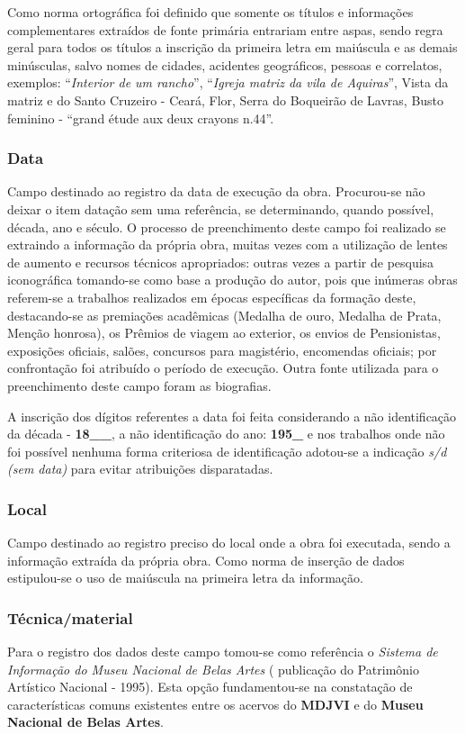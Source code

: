 Como norma ortográfica foi definido que somente os títulos e informações complementares extraídos de fonte primária entrariam entre aspas, sendo regra geral para todos os títulos a inscrição da primeira letra em maiúscula e as demais minúsculas, salvo nomes de cidades, acidentes geográficos, pessoas e correlatos, exemplos: ``\textit{Interior de um rancho}'', ``\textit{Igreja matriz da vila de Aquiras}'', Vista da matriz e do Santo Cruzeiro - Ceará, Flor, Serra do Boqueirão de Lavras, Busto feminino - ``grand étude aux deux crayons n.44''.

\subsubsection{Data}
Campo destinado ao registro da data de execução da obra. Procurou-se não deixar o item datação sem uma referência, se determinando, quando possível, década, ano e século. O processo de preenchimento deste campo foi realizado se extraindo a informação da própria obra, muitas vezes com a utilização de lentes de aumento e recursos técnicos apropriados: outras vezes a partir de pesquisa iconográfica tomando-se como base a produção do autor, pois que inúmeras obras referem-se a trabalhos realizados em épocas específicas da formação deste, destacando-se as premiações acadêmicas (Medalha de ouro, Medalha de Prata, Menção honrosa), os Prêmios de viagem ao exterior, os envios de Pensionistas, exposições oficiais, salões, concursos para magistério, encomendas oficiais; por confrontação foi atribuído o período de execução. Outra fonte utilizada para o preenchimento deste campo foram as biografias.

A inscrição dos dígitos referentes a data foi feita considerando a não identificação da década - \textbf{18\_\_}, a não identificação do ano: \textbf{195\_} e nos trabalhos onde não foi possível nenhuma forma criteriosa de identificação adotou-se a indicação \textit{s/d (sem data)} para evitar atribuições disparatadas.

\subsubsection{Local}
Campo destinado ao registro preciso do local onde a obra foi executada, sendo a informação extraída da própria obra. Como norma de inserção de dados estipulou-se o uso de maiúscula na primeira letra da informação.

\subsubsection{Técnica/material}
Para o registro dos dados deste campo tomou-se como referência o \textit{Sistema de Informação do Museu Nacional de Belas Artes} ( publicação do Patrimônio Artístico Nacional - 1995). Esta opção fundamentou-se na constatação de características comuns existentes entre os acervos do \textbf{MDJVI} e do \textbf{Museu Nacional de Belas Artes}.

